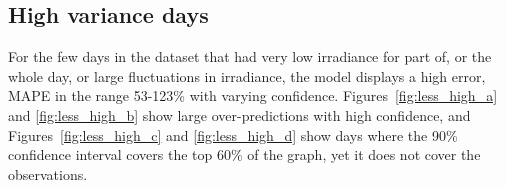 \clearpage
\subsection{High variance days}
For the few days in the dataset that had very low irradiance for part of, or the whole day, or large fluctuations in irradiance, the model displays a high error, MAPE in the range 53-123\% with varying confidence. Figures~\ref{fig:less_high_a} and \ref{fig:less_high_b} show large over-predictions with high confidence, and Figures~\ref{fig:less_high_c} and \ref{fig:less_high_d} show days where the 90\% confidence interval covers the top 60\% of the graph, yet it does not cover the observations.
\begin{figure}[ht!]
    \centering
    \qquad
    \qquad
    \qquad

\end{figure}
